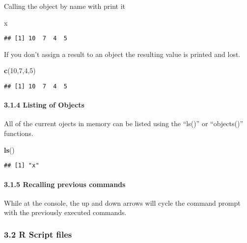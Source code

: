 \documentclass[
]{article}
\newenvironment{Shaded}{\begin{snugshade}}{\end{snugshade}}
\newcommand{\DecValTok}[1]{\textcolor[rgb]{0.00,0.00,0.81}{#1}}
\newcommand{\FunctionTok}[1]{\textcolor[rgb]{0.13,0.29,0.53}{\textbf{#1}}}
\newcommand{\NormalTok}[1]{#1}
\begin{document}
Calling the object by name with print it

\begin{Shaded}
\begin{Highlighting}[]
\NormalTok{x}
\end{Highlighting}
\end{Shaded}

\begin{verbatim}
## [1] 10  7  4  5
\end{verbatim}

If you don't assign a result to an object the resulting value is printed
and lost.

\begin{Shaded}
\begin{Highlighting}[]
\FunctionTok{c}\NormalTok{(}\DecValTok{10}\NormalTok{,}\DecValTok{7}\NormalTok{,}\DecValTok{4}\NormalTok{,}\DecValTok{5}\NormalTok{)}
\end{Highlighting}
\end{Shaded}

\begin{verbatim}
## [1] 10  7  4  5
\end{verbatim}

\paragraph{3.1.4 Listing of Objects}\label{listing-of-objects}

All of the current ojects in memory can be listed using the ``ls()'' or
``objects()'' functions.

\begin{Shaded}
\begin{Highlighting}[]
\FunctionTok{ls}\NormalTok{()}
\end{Highlighting}
\end{Shaded}

\begin{verbatim}
## [1] "x"
\end{verbatim}

\paragraph{3.1.5 Recalling previous
commands}\label{recalling-previous-commands}

While at the console, the up and down arrows will cycle the command
prompt with the previously executed commands.

\subsubsection{3.2 R Script files}\label{r-script-files}
\end{document}
